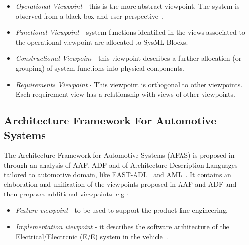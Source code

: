\begin{itemize}
\item {\em Operational Viewpoint} - this is the more abstract viewpoint. %
The system is observed from a black box and user perspective~\cite{AFRenault}.
\item {\em Functional  Viewpoint} - system functions %
identified in the views associated to the operational viewpoint %
are allocated to SysML Blocks. 
\item {\em Constructional Viewpoint} - this viewpoint %
describes a further allocation (or grouping) of system functions into physical components.
\item {\em Requirements Viewpoint} - This viewpoint is orthogonal to other viewpoints. Each requirement view has a relationship with views of
other viewpoints. 
\end{itemize}

\subsection{Architecture Framework For Automotive Systems}
The Architecture Framework for Automotive Systems (AFAS) is proposed in~\cite{Yania} through an analysis of AAF, ADF and of Architecture Description Languages~\cite{ADL_Neno00,whatindustrywants} tailored to automotive domain, like EAST-ADL~\cite{EAST-ADL} %
and AML~\cite{AML}. 
It contains an elaboration and unification of the viewpoints proposed in AAF and ADF and then proposes additional viewpoints, e.g.:

\begin{itemize}
\item {\em Feature viewpoint} - to be used to support the product line engineering. %
\item {\em Implementation viewpoint} - 
it describes the software architecture of the Electrical/Electronic (E/E) system in the vehicle~\cite{EAST-ADL}. %
\end{itemize}


